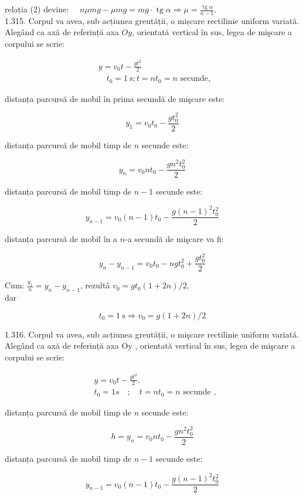 \documentclass[10pt]{article}
\begin{document}
relația (2) devine: $\quad n \mu m g-\mu m g=m g \cdot \operatorname{tg} \alpha \Rightarrow \mu=\frac{\operatorname{tg} \alpha}{n-1}$.\\
1.315. Corpul va avea, sub acțiunea greutății, o mișcare rectilinie uniform variată. Alegând ca axă de referință axa $O y$, orientată vertical în sus, legea de mişcare a corpului se scrie:

$$
\begin{aligned}
& y=v_{0} t-\frac{g t^{2}}{2} \\
& \quad t_{0}=1 \mathrm{~s} ; t=n t_{0}=n \text { secunde, }
\end{aligned}
$$

distanța parcursă de mobil în prima secundă de mişcare este:

$$
y_{1}=v_{0} t_{0}-\frac{g t_{0}^{2}}{2}
$$

distanța parcursă de mobil timp de $n$ secunde este:

$$
y_{n}=v_{0} n t_{0}-\frac{g n^{2} t_{0}^{2}}{2}
$$

distanța parcursă de mobil timp de $n-1$ secunde este:

$$
y_{n-1}=v_{0}(n-1) t_{0}-\frac{g(n-1)^{2} t_{0}^{2}}{2}
$$

distanța parcursă de mobil în a $n$-a secundă de mişcare va fi:

$$
y_{n}-y_{n-1}=v_{0} t_{0}-n g t_{0}^{2}+\frac{g t_{0}^{2}}{2}
$$

Cum: $\frac{y_{1}}{n}=y_{n}-y_{n-1}$, rezultǎ $v_{0}=g t_{0}(1+2 n) / 2$,\\
dar

$$
t_{0}=1 \mathrm{~s} \Rightarrow v_{0}=g(1+2 n) / 2
$$

1.316. Corpul va avea, sub acțiunea greutății, o mişcare rectilinie uniform variată. Alegând ca axă de referință axa Oy , orientată vertical în sus, legea de mişcare a corpului se scrie:

$$
\begin{aligned}
& y=v_{0} t-\frac{g t^{2}}{2}, \\
& t_{0}=1 s \quad ; \quad t=n t_{0}=n \text { secunde },
\end{aligned}
$$

distanța parcursă de mobil timp de $n$ secunde este:

$$
h=y_{n}=v_{0} n t_{0}-\frac{g n^{2} t_{0}^{2}}{2}
$$

distanța parcursă de mobil timp de $n-1$ secunde este:

$$
y_{n-1}=v_{0}(n-1) t_{0}-\frac{g(n-1)^{2} t_{0}^{2}}{2}
$$
\end{document}

